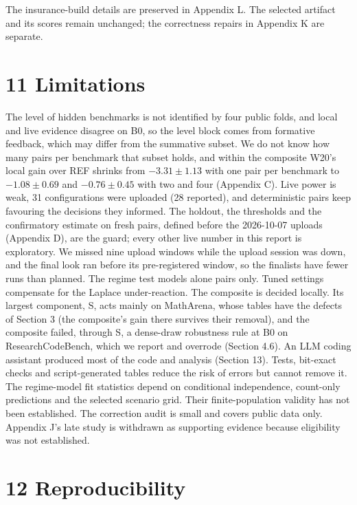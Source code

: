 \documentclass[
]{article}
\begin{document}
The insurance-build details are preserved in Appendix L. The selected
artifact and its scores remain unchanged; the correctness repairs in
Appendix K are separate.

\section{11 Limitations}\label{limitations}

The level of hidden benchmarks is not identified by four public folds,
and local and live evidence disagree on B0, so the level block comes
from formative feedback, which may differ from the summative subset. We
do not know how many pairs per benchmark that subset holds, and within
the composite W20's local gain over REF shrinks from \(-3.31 \pm 1.13\)
with one pair per benchmark to \(-1.08 \pm 0.69\) and \(-0.76 \pm 0.45\)
with two and four (Appendix C). Live power is weak, 31 configurations
were uploaded (28 reported), and deterministic pairs keep favouring the
decisions they informed. The holdout, the thresholds and the
confirmatory estimate on fresh pairs, defined before the 2026-10-07
uploads (Appendix D), are the guard; every other live number in this
report is exploratory. We missed nine upload windows while the upload
session was down, and the final look ran before its pre-registered
window, so the finalists have fewer runs than planned. The regime test
models alone pairs only. Tuned settings compensate for the Laplace
under-reaction. The composite is decided locally. Its largest component,
S, acts mainly on MathArena, whose tables have the defects of Section 3
(the composite's gain there survives their removal), and the composite
failed, through S, a dense-draw robustness rule at B0 on
ResearchCodeBench, which we report and overrode (Section 4.6). An LLM
coding assistant produced most of the code and analysis (Section 13).
Tests, bit-exact checks and script-generated tables reduce the risk of
errors but cannot remove it. The regime-model fit statistics depend on
conditional independence, count-only predictions and the selected
scenario grid. Their finite-population validity has not been
established. The correction audit is small and covers public data only.
Appendix J's late study is withdrawn as supporting evidence because
eligibility was not established.

\section{12 Reproducibility}\label{reproducibility}
\end{document}
